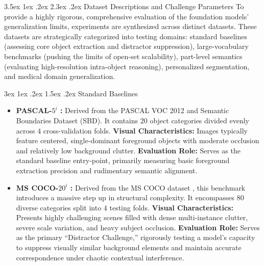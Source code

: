 \documentclass[journal,12pt,onecolumn,draftclsnofoot]{IEEEtran}
\makeatletter
\renewcommand{\section}{\@startsection{section}{1}{\z@}%
    {3.5ex \@plus 1ex \@minus .2ex}%
    {2.3ex \@plus.2ex}%
    {\normalfont\Large\bfseries}}
\renewcommand{\subsection}{\@startsection{subsection}{2}{\z@}%
    {3ex \@plus 1ex \@minus .2ex}%
    {1.5ex \@plus.2ex}%
    {\normalfont\large\bfseries}}
\makeatother
\begin{document}
\section{Dataset Descriptions and Challenge Parameters}
To provide a highly rigorous, comprehensive evaluation of the foundation models' generalization limits, experiments are synthesized across distinct datasets. These datasets are strategically categorized into testing domains: standard baselines (assessing core object extraction and distractor suppression), large-vocabulary benchmarks (pushing the limits of open-set scalability), part-level semantics (evaluating high-resolution intra-object reasoning), personalized segmentation, and medical domain generalization.

\subsection{Standard Baselines}
\begin{itemize}
    \item \textbf{PASCAL-$5^i$ \cite{shaban2017one}:} Derived from the PASCAL VOC 2012 \cite{everingham2010pascal} and Semantic Boundaries Dataset (SBD). It contains 20 object categories divided evenly across 4 cross-validation folds. 
    \textbf{Visual Characteristics:} Images typically feature centered, single-dominant foreground objects with moderate occlusion and relatively low background clutter. 
    \textbf{Evaluation Role:} Serves as the standard baseline entry-point, primarily measuring basic foreground extraction precision and rudimentary semantic alignment.
    
    \item \textbf{MS COCO-$20^i$ \cite{nguyen2019feature}:} Derived from the MS COCO dataset \cite{lin2014microsoft}, this benchmark introduces a massive step up in structural complexity. It encompasses 80 diverse categories split into 4 testing folds. 
    \textbf{Visual Characteristics:} Presents highly challenging scenes filled with dense multi-instance clutter, severe scale variation, and heavy subject occlusion. 
    \textbf{Evaluation Role:} Serves as the primary ``Distractor Challenge,'' rigorously testing a model's capacity to suppress visually similar background elements and maintain accurate correspondence under chaotic contextual interference.
\end{itemize}
\end{document}
